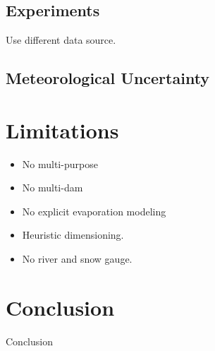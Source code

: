 \documentclass{article}
\begin{document}
\subsection{Experiments}
\label{sec:Meteo Experiments}

Use different data source.


\subsection{Meteorological Uncertainty}

\section{Limitations}

\begin{itemize}
	\item No multi-purpose
	\item No multi-dam
 	\item No explicit evaporation modeling
	\item Heuristic dimensioning.
	\item No river and snow gauge.
\end{itemize}

\section{Conclusion}
\label{sec:Conclusion}

Conclusion


\end{document}
